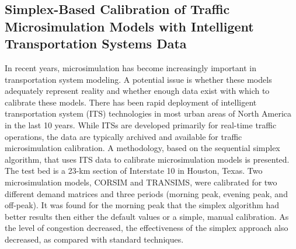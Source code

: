 \documentclass{article}
\begin{document}
\subsection*{Simplex-Based Calibration of Traffic Microsimulation Models with Intelligent Transportation Systems Data \cite{simplexCalib}
}
In recent years, microsimulation has become increasingly important in transportation system modeling. A potential issue is whether these models adequately represent reality and whether enough data exist with which to calibrate these models. There has been rapid deployment of intelligent transportation system (ITS) technologies in most urban areas of North America in the last 10 years. While ITSs are developed primarily for real-time traffic operations, the data are typically archived and available for traffic microsimulation calibration. A methodology, based on the sequential simplex algorithm, that uses ITS data to calibrate microsimulation models is presented. The test bed is a 23-km section of Interstate 10 in Houston, Texas. Two microsimulation models, CORSIM and TRANSIMS, were calibrated for two different demand matrices and three periods (morning peak, evening peak, and off-peak). It was found for the morning peak that the simplex algorithm had better results then either the default values or a simple, manual calibration. As the level of congestion decreased, the effectiveness of the simplex approach also decreased, as compared with standard techniques.



\subsection*{ \cite{}}
\end{document}
